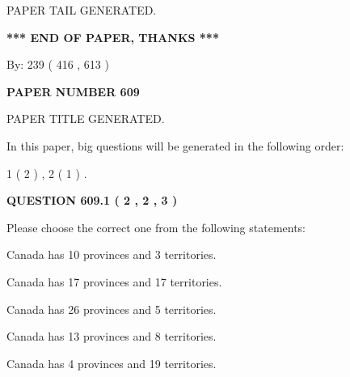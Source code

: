 \documentclass[12pt]{article}
\begin{document}
   
   
\vspace{2.0in} PAPER TAIL GENERATED.
   
   
   
   
\vspace{1.0in} 
{\textbf{\large{ *** END OF PAPER, THANKS *** }}} 
   
   
\hspace{1.0in} By: 
 239 ( 416 ,  613 )
   
   
   
   
\newpage 
\setcounter{page}{ 
   609001 } 
   
   
   
   
 {\textbf{ \Large{ PAPER NUMBER  609  }}}
   
   
\vspace{0.2in}
   
   
   
   
   
   
   
   
 \vspace{0.2in}
 
 
 
 
   
   
 PAPER TITLE GENERATED.
   
   
   
\vspace{0.2in}
   
In this paper, big questions will be generated in the following order: 
   
   
   1 ( 2 )
 ,
   2 ( 1 )
 .
  
\vspace{0.2in}
  
{\textbf{\Large{QUESTION
609.1 
 ( 2 , 2 , 3 )
}}}
  
  
Please choose the correct one from the following statements:
 
 
Canada has 10  provinces and 3 territories.
 
 
Canada has  17 provinces and  17 territories.
 
 
Canada has  26 provinces and  5 territories.
 
 
Canada has  13 provinces and  8 territories.
 
 
Canada has   4 provinces and  19 territories.
 
\end{document}
